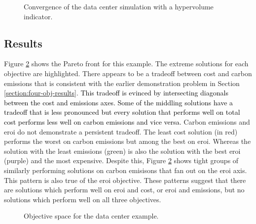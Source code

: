 \begin{figure}[htbp!]
    \centering
    \resizebox{0.75\columnwidth}{!}{}
    \caption{Convergence of the data center simulation with a hypervolume indicator.}
    \label{fig:convergence}
\end{figure}



\subsection{Results}

Figure \ref{fig:dc_objective_space} shows the Pareto front for this example. The
extreme solutions for each objective are highlighted. There appears to be a
tradeoff between cost and carbon emissions that is consistent with the earlier
demonstration problem in Section \ref{section:four-obj-results}.
\textcolor{black}{This tradeoff is evinced by intersecting diagonals between the
cost and emissions axes. Some of the middling solutions have a tradeoff that is
less pronounced but every solution that performs well on total cost performs
less well on carbon emissions and vice versa.} Carbon emissions and \ac{eroi} do
not demonstrate a persistent tradeoff. The least cost solution (in red) performs
the worst on carbon emissions but among the best on \ac{eroi}. Whereas the
solution with the least emissions (green) is also the solution with the best
\ac{eroi} (purple) and the most expensive. Despite this, Figure
\ref{fig:dc_objective_space} shows tight groups of similarly performing
solutions on carbon emisisons that fan out on the \ac{eroi} axis. This pattern
is also true of the \ac{eroi} objective. These patterns suggest that there are
solutions which perform well on \ac{eroi} and cost, or \ac{eroi} and emissions,
but no solutions which perform well on all three objectives.

\begin{figure}[htbp!]
    \centering
    \resizebox{\columnwidth}{!}{}
    \caption{Objective space for the data center example.}
    \label{fig:dc_objective_space}
\end{figure}


